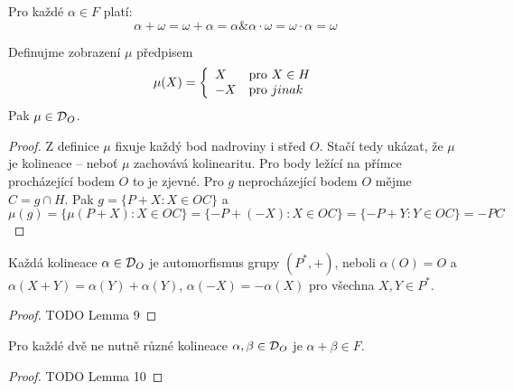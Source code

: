 \begin{observation}
	Pro každé $\alpha \in F$ platí:
	\[ \alpha + \omega = \omega + \alpha = \alpha \& \alpha \cdot \omega = \omega \cdot \alpha = \omega \]
\end{observation}

\begin{lemma}[O zobrazení $\mu$]
    Definujme zobrazení $\mu$ předpisem
    \[ \mu(X) = \left\{ \begin{array}{ll} X & \mbox{pro } X \in H \\ -X & \mbox{pro } jinak \end{array} \right. \]
    Pak $\mu\in \operatorname{\mathcal{D}}_O$.
\end{lemma}
\begin{proof}
    Z definice $\mu$ fixuje každý bod nadroviny i střed $O$.
    Stačí tedy ukázat, že $\mu$ je kolineace -- neboť $\mu$ zachovává kolinearitu.
    Pro body ležící na přímce procházející bodem $O$ to je zjevné.
    Pro $g$ neprocházející bodem $O$ mějme $C=g\cap H$.
    Pak $g=\{P+X: X\in OC\}$ a
    \[ \mu(g) = \{\mu(P+X): X\in OC\} = \{-P+(-X):X\in OC\}=\{-P+Y: Y\in OC\}=-PC \]
\end{proof}
\begin{lemma}
    Každá kolineace $\alpha\in \operatorname{\mathcal{D}}_O$ je automorfismus grupy $(P^*,+)$, neboli $\alpha(O)=O$ a $\alpha(X+Y)=\alpha(Y)+\alpha(Y)$, $\alpha(-X)=-\alpha(X)$ pro všechna $X,Y\in P^*$.
\end{lemma}
\begin{proof}
    TODO Lemma 9
\end{proof}
\begin{lemma}
    Pro každé dvě ne nutně různé kolineace $\alpha,\beta\in \operatorname{\mathcal{D}}_O$ je $\alpha+\beta\in F$.
\end{lemma}
\begin{proof}
    TODO Lemma 10
\end{proof}

